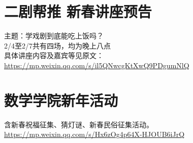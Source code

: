 \documentclass[letterpaper, 12pt]{article}
\begin{document}
\begin{multicols}{2}
\section{二剧帮推 新春讲座预告}
主题：学戏剧到底能吃上饭吗？\\
2/4至2/7共有四场，均为晚上八点\\
具体讲座内容及嘉宾等见原文：\url{https://mp.weixin.qq.com/s/il5QNwcgKtXwQ9PDgumNlQ}

\section{数学学院新年活动}
含新春祝福征集、猜灯谜、新春民俗征集活动。\\
\url{https://mp.weixin.qq.com/s/Hx6zOg4p64X-HJOUB6iJrQ}

\end{multicols} 
\end{document}
